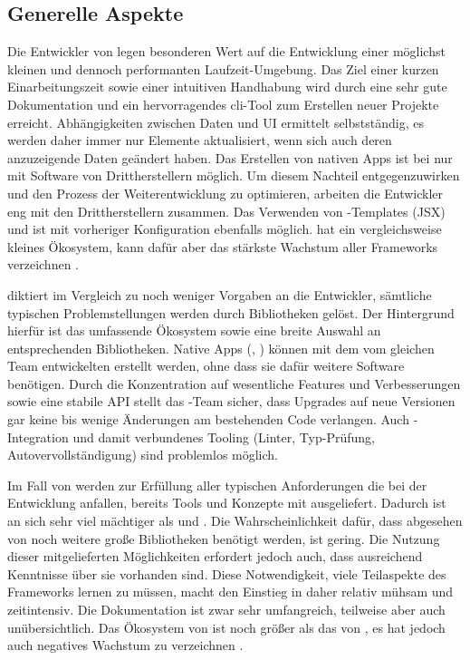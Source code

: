 \subsection{Generelle Aspekte}
Die Entwickler von  legen besonderen Wert auf die Entwicklung einer möglichst kleinen und dennoch performanten Laufzeit-Umgebung. Das Ziel einer kurzen Einarbeitungszeit sowie einer intuitiven Handhabung wird durch eine sehr gute Dokumentation und ein hervorragendes \gls{cli}-Tool zum Erstellen neuer Projekte erreicht. Abhängigkeiten zwischen Daten und UI ermittelt  selbstständig, es werden daher immer nur Elemente aktualisiert, wenn sich auch deren anzuzeigende Daten geändert haben. Das Erstellen von nativen Apps ist bei  nur mit Software von Drittherstellern möglich. Um diesem Nachteil entgegenzuwirken und den Prozess der Weiterentwicklung zu optimieren, arbeiten die Entwickler eng mit den Drittherstellern zusammen. Das Verwenden von -Templates (JSX) und  ist mit vorheriger Konfiguration ebenfalls möglich.  hat ein vergleichsweise kleines Ökosystem, kann dafür aber das stärkste Wachstum aller Frameworks verzeichnen \parencite[vgl.][]{npmjs_2018}.

 diktiert im Vergleich zu  noch weniger Vorgaben an die Entwickler, sämtliche typischen Problemstellungen werden durch Bibliotheken gelöst. Der Hintergrund hierfür ist das umfassende Ökosystem sowie eine breite Auswahl an entsprechenden Bibliotheken. Native Apps (, ) können mit dem vom gleichen Team entwickelten  erstellt werden, ohne dass sie dafür weitere Software benötigen. Durch die Konzentration auf wesentliche Features und Verbesserungen sowie eine stabile API stellt das -Team sicher, dass Upgrades auf neue Versionen gar keine bis wenige Änderungen am bestehenden Code verlangen. Auch -Integration und damit verbundenes Tooling (Linter, Typ-Prüfung, Autovervollständigung) sind problemlos möglich.

Im Fall von  werden zur Erfüllung aller typischen Anforderungen die bei der Entwicklung anfallen, bereits Tools und Konzepte mit ausgeliefert. Dadurch ist  an sich sehr viel mächtiger als  und . Die Wahrscheinlichkeit dafür, dass abgesehen von  noch weitere große Bibliotheken benötigt werden, ist gering. Die Nutzung dieser mitgelieferten Möglichkeiten erfordert jedoch auch, dass ausreichend Kenntnisse über sie vorhanden sind. Diese Notwendigkeit, viele Teilaspekte des Frameworks lernen zu müssen, macht den Einstieg in  daher relativ mühsam und zeitintensiv. Die Dokumentation ist zwar sehr umfangreich, teilweise aber auch unübersichtlich. Das Ökosystem von  ist noch größer als das von , es hat jedoch auch negatives Wachstum zu verzeichnen \parencite[vgl.][]{npmjs_2018}.

